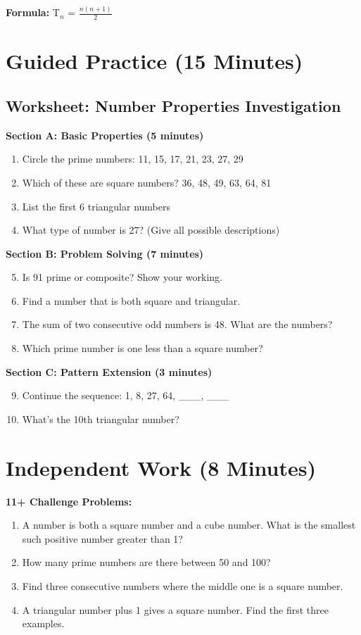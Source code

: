 \documentclass{article}
\begin{document}
\textbf{Formula:} T$_n$ = $\frac{n(n+1)}{2}$

\section{Guided Practice (15 Minutes)}

\subsection*{Worksheet: Number Properties Investigation}

\textbf{Section A: Basic Properties (5 minutes)}
\begin{enumerate}
    \item Circle the prime numbers: 11, 15, 17, 21, 23, 27, 29
    \item Which of these are square numbers? 36, 48, 49, 63, 64, 81
    \item List the first 6 triangular numbers
    \item What type of number is 27? (Give all possible descriptions)
\end{enumerate}

\textbf{Section B: Problem Solving (7 minutes)}
\begin{enumerate}
    \setcounter{enumi}{4}
    \item Is 91 prime or composite? Show your working.
    \item Find a number that is both square and triangular.
    \item The sum of two consecutive odd numbers is 48. What are the numbers?
    \item Which prime number is one less than a square number?
\end{enumerate}

\textbf{Section C: Pattern Extension (3 minutes)}
\begin{enumerate}
    \setcounter{enumi}{8}
    \item Continue the sequence: 1, 8, 27, 64, \_\_\_, \_\_\_
    \item What's the 10th triangular number?
\end{enumerate}

\section{Independent Work (8 Minutes)}

\textbf{11+ Challenge Problems:}
\begin{enumerate}
    \item A number is both a square number and a cube number. What is the smallest such positive number greater than 1?
    \item How many prime numbers are there between 50 and 100?
    \item Find three consecutive numbers where the middle one is a square number.
    \item A triangular number plus 1 gives a square number. Find the first three examples.
\end{enumerate}
\end{document}
